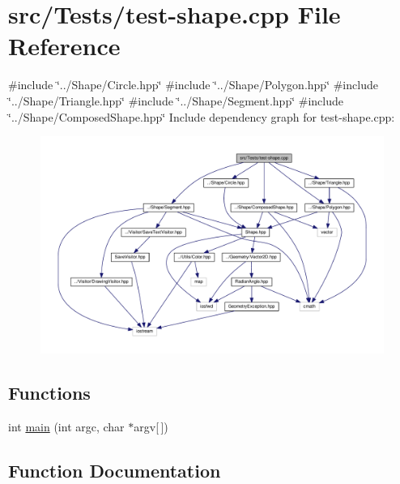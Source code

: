 \hypertarget{test-shape_8cpp}{}\section{src/\+Tests/test-\/shape.cpp File Reference}
\label{test-shape_8cpp}
{\ttfamily \#include \char`\"{}../\+Shape/\+Circle.\+hpp\char`\"{}}\newline
{\ttfamily \#include \char`\"{}../\+Shape/\+Polygon.\+hpp\char`\"{}}\newline
{\ttfamily \#include \char`\"{}../\+Shape/\+Triangle.\+hpp\char`\"{}}\newline
{\ttfamily \#include \char`\"{}../\+Shape/\+Segment.\+hpp\char`\"{}}\newline
{\ttfamily \#include \char`\"{}../\+Shape/\+Composed\+Shape.\+hpp\char`\"{}}\newline
Include dependency graph for test-\/shape.cpp\+:\nopagebreak
\begin{figure}[H]
\begin{center}
\leavevmode
\includegraphics[width=350pt]{test-shape_8cpp__incl}
\end{center}
\end{figure}
\subsection*{Functions}
\begin{DoxyCompactItemize}
\item 
int \hyperlink{test-shape_8cpp_a0ddf1224851353fc92bfbff6f499fa97}{main} (int argc, char $\ast$argv\mbox{[}$\,$\mbox{]})
\end{DoxyCompactItemize}


\subsection{Function Documentation}
\hypertarget{test-shape_8cpp_a0ddf1224851353fc92bfbff6f499fa97}{}\label{test-shape_8cpp_a0ddf1224851353fc92bfbff6f499fa97} 

